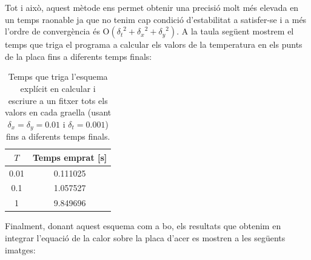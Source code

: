 \documentclass[10pt,a4paper]{article}
\renewcommand{\O}[1]{\mathrm{O}\left(#1\right)} %
\theoremstyle{definition}
\theoremstyle{remark}
\begin{document}
Tot i això, aquest mètode ens permet obtenir una precisió molt més elevada en un temps raonable ja que no tenim cap condició d'estabilitat a satisfer-se i a més l'ordre de convergència és $\O{{\delta_t}^2 + {\delta_x}^2 + {\delta_y}^2}$. A la taula següent mostrem el temps que triga el programa a calcular els valors de la temperatura en els punts de la placa fins a diferents temps finals:
\begin{table}[ht]
  \centering
  \begin{tabular}{c|c}
    $T$  & Temps emprat [s] \\ \hline\hline
    0.01 & 0.111025         \\
    0.1  & 1.057527         \\
    1    & 9.849696
  \end{tabular}
  \caption{Temps que triga l'esquema explícit en calcular i escriure a un fitxer tots els valors en cada graella (usant $\delta_x= \delta_y=0.01$ i $\delta_t=0.001$) fins a diferents temps finals.}
\end{table}
Finalment, donant aquest esquema com a bo, els resultats que obtenim en integrar l'equació de la calor sobre la placa d'acer es mostren a les següents imatges:
\end{document}
